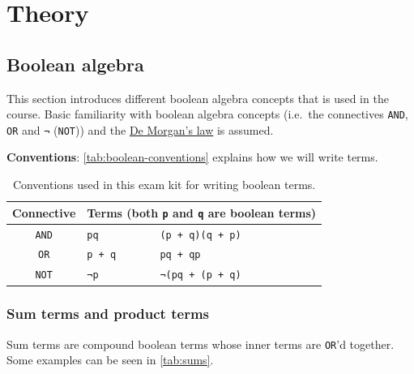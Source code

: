 \documentclass[a4paper,11pt]{report}
\newcommand{\enot}{¬}
\begin{document}
\newpage

\chapter{Theory}

\section{Boolean algebra}

This section introduces different boolean algebra concepts that is
used in the course. Basic familiarity with boolean algebra concepts
(i.e.\ the connectives \texttt{AND}, \texttt{OR} and \texttt{\enot}
(\texttt{NOT})) and the
\href{https://en.wikipedia.org/wiki/De\_Morgan\%27s\_laws}{De Morgan's
  law} is assumed.

\textbf{Conventions}: \autoref{tab:boolean-conventions} explains how
we will write terms.

\begin{table}
  \centering
  \begin{tabular}{c | l l}
    \textbf{Connective} & \multicolumn{2}{c}{\textbf{Terms} (both \texttt{p} and \texttt{q} are boolean terms)} \\ \hline
    \texttt{AND} & \hspace{1em}\texttt{pq} & \hspace{1em}\texttt{(p + q)(q + p)}\\
    \texttt{OR}  & \hspace{1em}\texttt{p + q} & \hspace{1em}\texttt{pq + qp} \\
    \texttt{NOT} & \hspace{1em}\texttt{\enot{p}} & \hspace{1em}\texttt{\enot{(pq + (p + q)}}\\
  \end{tabular}
  \caption[Conventions --- boolean terms]{Conventions used in this exam kit for writing boolean terms.}
  \label{tab:boolean-conventions}
\end{table}

\subsection{Sum terms and product terms}

Sum terms are compound boolean terms whose inner terms are
\texttt{OR}'d together. Some examples can be seen in
\autoref{tab:sums}.
\end{document}
